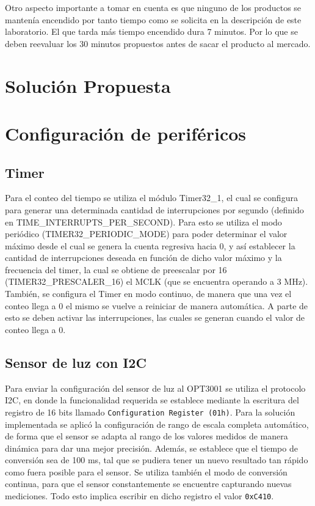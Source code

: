 Otro aspecto importante a tomar en cuenta es que ninguno de los productos se mantenía encendido por
tanto tiempo como se solicita en la descripción de este laboratorio. El que tarda más tiempo
encendido dura 7 minutos. Por lo que se deben reevaluar los 30 minutos propuestos antes de sacar el
producto al mercado.  

\section{Solución Propuesta}

\section{Configuración de periféricos}

\subsection{Timer}
Para el conteo del tiempo se utiliza el módulo Timer32\_1, el cual se configura para generar una
determinada cantidad de interrupciones por segundo (definido en TIME\_INTERRUPTS\_PER\_SECOND). Para
esto se utiliza el modo periódico (TIMER32\_PERIODIC\_MODE) para poder determinar el valor máximo
desde el cual se genera la cuenta regresiva hacia 0, y así establecer la cantidad de interrupciones
deseada en función de dicho valor máximo y la frecuencia del timer, la cual se obtiene de preescalar
por 16 (TIMER32\_PRESCALER\_16) el MCLK (que se encuentra operando a 3 MHz). También, se configura
el Timer en modo continuo, de manera que una vez el conteo llega a 0 el mismo se vuelve a reiniciar
de manera automática. A parte de esto se deben activar las interrupciones, las cuales se generan
cuando el valor de conteo llega a 0.

\subsection{Sensor de luz con I2C}
Para enviar la configuración del sensor de luz al OPT3001 se utiliza el protocolo I2C, en donde la
funcionalidad requerida se establece mediante la escritura del registro de 16 bits llamado
\texttt{Configuration Register (01h)}. Para la solución implementada se aplicó la configuración de
rango de escala completa automático, de forma que el sensor se adapta al rango de los valores
medidos de manera dinámica para dar una mejor precisión. Además, se establece que el tiempo de
conversión sea de 100 ms, tal que se pudiera tener un nuevo resultado tan rápido como fuera posible
para el sensor. Se utiliza también el modo de conversión continua, para que el sensor constantemente
se encuentre capturando nuevas mediciones. Todo esto implica escribir en dicho registro el valor
\texttt{0xC410}.

